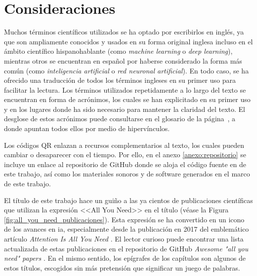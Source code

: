\section{Consideraciones}


Muchos términos científicos utilizados se ha optado por escribirlos en inglés, ya que son ampliamente conocidos y usados en su forma original inglesa incluso en el ámbito científico hispanohablante (como \emph{machine learning} o \emph{deep learning}), mientras otros se encuentran en español por haberse considerado la forma más común (como \emph{inteligencia artificial} o \emph{red neuronal artificial}). En todo caso, se ha ofrecido una traducción de todos los términos ingleses en su primer uso para facilitar la lectura. Los términos utilizados repetidamente a lo largo del texto se encuentran en forma de acrónimos, los cuales se han explicitado en su primer uso y en los lugares donde ha sido necesario para mantener la claridad del texto. El desglose de estos acrónimos puede consultarse en el glosario de la página~\pageref{chap:glosario}, a donde apuntan todos ellos por medio de hipervínculos.

Los códigos QR enlazan a recursos complementarios al texto, los cuales pueden cambiar o desaparecer con el tiempo. Por ello, en el anexo \ref{anexo:repositorio} se incluye un enlace al repositorio de GitHub donde se aloja el código fuente en  de este trabajo, así como los materiales sonoros y de software generados en el marco de este trabajo.

El título de este trabajo hace un guiño a las ya cientos de publicaciones científicas que utilizan la expresión <<All You Need>> en el título (véase la Figura \ref{fig:all_you_need_publicaciones}). Esta expresión se ha convertido en un icono de los avances en \gls{ia}, especialmente desde la publicación en 2017 del emblemático artículo \emph{Attention Is All You Need} \citep{vaswaniAttentionAllYou2017}. El lector curioso puede encontrar una lista actualizada de estas publicaciones en el repositorio de GitHub \emph{Awesome "all you need" papers} \citep{nishiKentoNishiAwesomeallyouneedpapers2024}. En el mismo sentido, los epígrafes de los capítulos son algunos de estos títulos, escogidos sin más pretensión que significar un juego de palabras.


